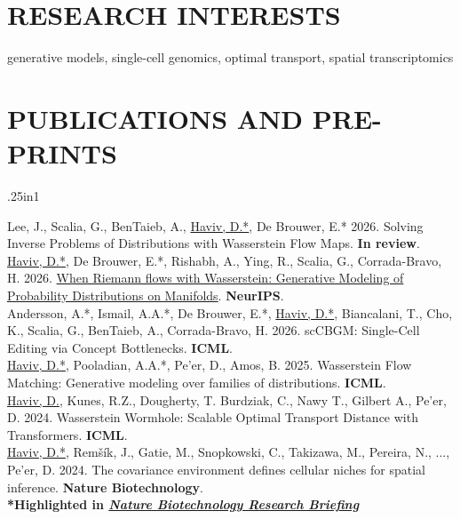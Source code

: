 \documentclass[a4paper,9pt]{extarticle}
\begin{document}
\section*{RESEARCH INTERESTS}
\noindent
generative models, single-cell genomics, optimal transport, spatial transcriptomics

\section*{PUBLICATIONS AND PRE-PRINTS}
\begin{hangparas}{.25in}{1}

\normalsize Lee, J., Scalia, G., BenTaieb, A., \underline{Haviv, D.*}, De Brouwer, E.* 2026. Solving Inverse Problems of Distributions with Wasserstein Flow Maps. \textbf{In review}.\\

\normalsize{\underline{Haviv, D.*}, De Brouwer, E.*, Rishabh, A., Ying, R., Scalia, G., Corrada-Bravo, H. 2026. \href{https://arxiv.org/abs/2609.25659}{When Riemann flows with Wasserstein: Generative Modeling of Probability Distributions on Manifolds}. \textbf{NeurIPS}.\\



\normalsize Andersson, A.*, Ismail, A.A.*, De Brouwer, E.*, \underline{Haviv, D.*}, Biancalani, T., Cho, K., Scalia, G., BenTaieb, A., Corrada-Bravo, H. 2026. scCBGM: Single-Cell Editing via Concept Bottlenecks. \textbf{ICML}.\\


\underline{Haviv, D.*}, Pooladian, A.A.*, Pe'er, D., Amos, B. 2025. Wasserstein Flow Matching: Generative modeling over families of distributions. \textbf{ICML}.\\

\underline{Haviv, D.}, Kunes, R.Z., Dougherty, T. Burdziak, C., Nawy T., Gilbert A., Pe'er, D. 2024. Wasserstein Wormhole: Scalable Optimal Transport Distance with Transformers. \textbf{ICML}.\\

\underline{Haviv, D.*}, Remšík, J., Gatie, M., Snopkowski, C., Takizawa, M., Pereira, N., ..., Pe’er, D. 2024. The covariance environment defines cellular niches for spatial inference. \textbf{Nature Biotechnology}.\\
\textbf{*Highlighted in \href{https://www.nature.com/articles/s41587-024-02207-1}{\textit{Nature Biotechnology Research Briefing}}}\\

}
\end{hangparas}
\end{document}
